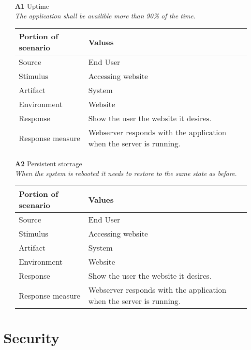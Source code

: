 \begin{itemize}
    \item[\textbf{A1}] Uptime \\
    \textit{\small{The application shall be availible more than 90\% of the time.}}
        
    \begin{tabular}{| l | p{7cm} |}
        \hline
        \rowcolor[gray]{0.8}
        \textbf{Portion of scenario} & \textbf{Values} \\
        \hline
        Source & End User \\
        Stimulus & Accessing website \\
        Artifact & System \\
        Environment & Website \\
        Response & Show the user the website it desires. \\
        Response measure & Webserver responds with the application when the server is running. \\
        \hline
    \end{tabular}

    \item[\textbf{A2}] Persistent storrage \\
    \textit{\small{When the system is rebooted it needs to restore to the same state as before.}}
        
    \begin{tabular}{| l | p{7cm} |}
        \hline
        \rowcolor[gray]{0.8}
        \textbf{Portion of scenario} & \textbf{Values} \\
        \hline
        Source & End User \\
        Stimulus & Accessing website \\
        Artifact & System \\
        Environment & Website \\
        Response & Show the user the website it desires. \\
        Response measure & Webserver responds with the application when the server is running. \\
        \hline
    \end{tabular}
\end{itemize}

\section{Security}


